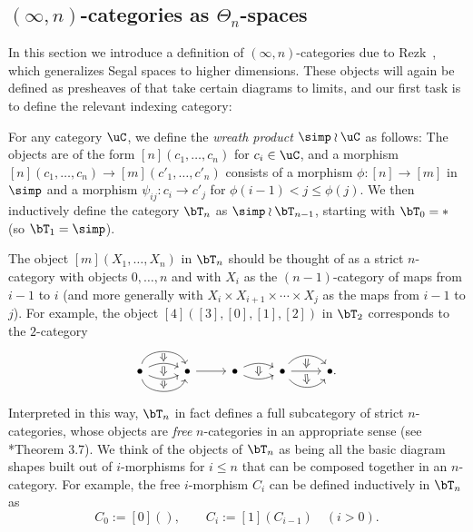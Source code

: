 \documentclass[a4paper,12pt]{article}
\begin{document}
\subsection{$(\infty,n)$-categories as
  $\Theta_n$-spaces}\label{subsec:thetan}
In this section we introduce a definition of $(\infty,n)$-categories
due to Rezk~\cite{RezkThetan}, which generalizes Segal spaces to
higher dimensions. These objects will again be defined as presheaves of
\igpds{} that take certain diagrams to limits, and our first task is
to define the relevant indexing category:
\begin{defn}\label{def:wreath}
  For any category $\uC$, we define the \emph{wreath product}
  $\simp \wr \uC$ as follows: The objects are of the form
  $[n](c_{1},\ldots,c_{n})$ for $c_{i} \in \uC$, and a morphism
  $[n](c_{1},\ldots,c_{n}) \to [m](c'_{1},\ldots,c'_{n})$ consists of
  a morphism $\phi \colon [n] \to [m]$ in $\simp$ and a morphism
  $\psi_{ij} \colon c_{i} \to c'_{j}$ for $\phi(i-1)< j \leq \phi(j)$.
  We then inductively define the category $\bT_{n}$ as
  $\simp \wr \bT_{n-1}$, starting with $\bT_{0} = *$ (so
  $\bT_{1} = \simp$).
\end{defn}

\begin{remark}
  The object $[m](X_{1},\ldots,X_{n})$ in $\bT_{n}$ should be thought
  of as a strict $n$-category with objects $0,\ldots,n$ and with
  $X_{i}$ as the $(n-1)$-category of maps from $i-1$ to $i$ (and more
  generally with $X_{i} \times X_{i+1} \times \cdots \times X_{j}$ as
  the maps from $i-1$ to $j$). For example, the object
  $[4]([3],[0],[1],[2])$ in $\bT_{2}$ corresponds to 
  the $2$-category
\[
\begin{tikzcd}
  \bullet 
  \ar[r, bend left=75, ""{below,name=A,inner sep=0.5pt}] 
  \ar[r, bend left=25, ""{name=B1,inner sep=0.5pt},
  ""{name=B2,below,inner sep=1pt}] 
  \ar[r, bend right=25, ""{name=C1,inner sep=1pt}, ""{below,name=C2,inner sep=0.5pt}] 
  \ar[r, bend right=75, ""{name=D,inner sep=1pt}] &
  \bullet 
  \ar[r]  &
  \bullet 
  \ar[r, bend left=25, ""{below,name=E,inner sep=1pt}] 
  \ar[r, bend right=25, ""{name=F,inner sep=1pt}] &
  \bullet 
  \ar[r, bend left=50, ""{below,name=G,inner sep=1pt}] 
  \ar[r, ""{name=H1,inner sep=1pt}, ""{name=H2,below,inner sep=1pt}] 
  \ar[r, bend right=50, ""{name=I,inner sep=1pt}] &
  \bullet.
  \arrow[from=A,to=B1,Rightarrow]
  \arrow[from=B2,to=C1,Rightarrow]
  \arrow[from=C2,to=D,Rightarrow]
  \arrow[from=E,to=F,Rightarrow]
  \arrow[from=G,to=H1,Rightarrow]
  \arrow[from=H2,to=I,Rightarrow]
\end{tikzcd}
\]  
Interpreted in this way, $\bT_{n}$ in fact defines a full subcategory
of strict $n$-categories, whose objects are \emph{free} $n$-categories
in an appropriate sense (see \cite{BergerWreath}*{Theorem 3.7}). We
think of the objects of $\bT_{n}$ as being all the basic diagram shapes
built out of $i$-morphisms for $i \leq n$ that can be composed
together in an $n$-category. For example, the free $i$-morphism
$C_{i}$ can be defined inductively in $\bT_{n}$ as
\[ C_{0} := [0](), \qquad C_{i} := [1](C_{i-1})\quad(i>0).\]
\end{remark}
\end{document}
